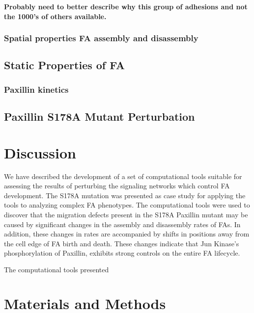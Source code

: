 \documentclass[10pt]{article}
\begin{document}
\textbf{Probably need to better describe why this group of adhesions and not the 1000's of others available.}

\subsubsection*{Spatial properties FA assembly and disassembly}


\subsection*{Static Properties of FA}

\subsubsection*{Paxillin kinetics}


\subsection*{Paxillin S178A Mutant Perturbation}



\section*{Discussion}

We have described the development of a set of computational tools suitable for
assessing the results of perturbing the signaling networks which control FA
development. The S178A mutation was presented as case study for applying the
tools to analyzing complex FA phenotypes. The computational tools were used to
discover that the migration defects present in the S178A Paxillin mutant may be
caused by significant changes in the assembly and disassembly rates of FAs. In
addition, these changes in rates are accompanied by shifts in positions away
from the cell edge of FA birth and death. These changes indicate that Jun
Kinase's phosphorylation of Paxillin, exhibits strong controls on the entire FA
lifecycle.

The computational tools presented 




\section*{Materials and Methods}
\end{document}
